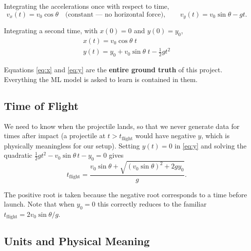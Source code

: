 \documentclass[11pt,a4paper]{article}
\newcommand{\vzero}{v_{0}}
\newcommand{\yzero}{y_{0}}
\begin{document}
Integrating the accelerations once with respect to time,
\begin{equation}
  v_{x}(t)=\vzero\cos\theta \quad\text{(constant --- no horizontal force)},
  \qquad
  v_{y}(t)=\vzero\sin\theta-gt .
\end{equation}

Integrating a second time, with $x(0)=0$ and $y(0)=\yzero$,
\begin{align}
  \boxed{\;x(t) = \vzero\cos\theta\;t\;} \label{eq:x}\\[0.2em]
  \boxed{\;y(t) = \yzero+\vzero\sin\theta\;t-\tfrac{1}{2}gt^{2}\;} \label{eq:y}
\end{align}

Equations \eqref{eq:x} and \eqref{eq:y} are the \textbf{entire ground truth} of this project.
Everything the ML model is asked to learn is contained in them.

\subsection{Time of Flight}

We need to know when the projectile lands, so that we never generate data for times after impact
(a projectile at $t>t_{\text{flight}}$ would have negative $y$, which is physically meaningless for
our setup). Setting $y(t)=0$ in \eqref{eq:y} and solving the quadratic
$\tfrac{1}{2}gt^{2}-\vzero\sin\theta\,t-\yzero=0$ gives
\begin{equation}
  t_{\text{flight}}
  =\frac{\vzero\sin\theta+\sqrt{(\vzero\sin\theta)^{2}+2g\yzero}}{g}.
  \label{eq:tof}
\end{equation}

The positive root is taken because the negative root corresponds to a time before launch. Note that
when $\yzero=0$ this correctly reduces to the familiar
$t_{\text{flight}}=2\vzero\sin\theta/g$.

\subsection{Units and Physical Meaning}
\end{document}
